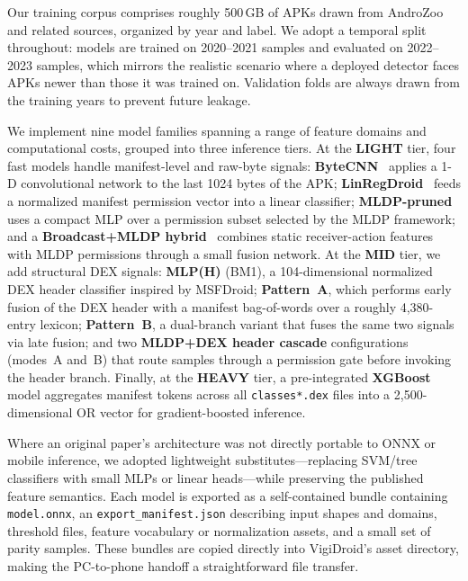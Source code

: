 \documentclass[conference]{IEEEtran}
\begin{document}
	Our training corpus comprises roughly 500\,GB of APKs drawn from AndroZoo and related sources, organized by year and label. We adopt a temporal split throughout: models are trained on 2020--2021 samples and evaluated on 2022--2023 samples, which mirrors the realistic scenario where a deployed detector faces APKs newer than those it was trained on. Validation folds are always drawn from the training years to prevent future leakage.
	
	We implement nine model families spanning a range of feature domains and computational costs, grouped into three inference tiers. At the \textbf{LIGHT} tier, four fast models handle manifest-level and raw-byte signals: \textbf{ByteCNN}~\cite{bytecnn} applies a 1-D convolutional network to the last 1024 bytes of the APK; \textbf{LinRegDroid}~\cite{linregdroid} feeds a normalized manifest permission vector into a linear classifier; \textbf{MLDP-pruned}~\cite{mldp} uses a compact MLP over a permission subset selected by the MLDP framework; and a \textbf{Broadcast+MLDP hybrid}~\cite{broadcast,mldp} combines static receiver-action features with MLDP permissions through a small fusion network. At the \textbf{MID} tier, we add structural DEX signals: \textbf{MLP(H)} (BM1), a 104-dimensional normalized DEX header classifier inspired by MSFDroid; \textbf{Pattern~A}, which performs early fusion of the DEX header with a manifest bag-of-words over a roughly 4,380-entry lexicon; \textbf{Pattern~B}, a dual-branch variant that fuses the same two signals via late fusion; and two \textbf{MLDP+DEX header cascade} configurations (modes~A and~B) that route samples through a permission gate before invoking the header branch. Finally, at the \textbf{HEAVY} tier, a pre-integrated \textbf{XGBoost} model aggregates manifest tokens across all \texttt{classes*.dex} files into a 2,500-dimensional OR vector for gradient-boosted inference.
	
	Where an original paper's architecture was not directly portable to ONNX or mobile inference, we adopted lightweight substitutes---replacing SVM/tree classifiers with small MLPs or linear heads---while preserving the published feature semantics. Each model is exported as a self-contained bundle containing \texttt{model.onnx}, an \texttt{export\_manifest.json} describing input shapes and domains, threshold files, feature vocabulary or normalization assets, and a small set of parity samples. These bundles are copied directly into VigiDroid's asset directory, making the PC-to-phone handoff a straightforward file transfer.
	
\end{document}
